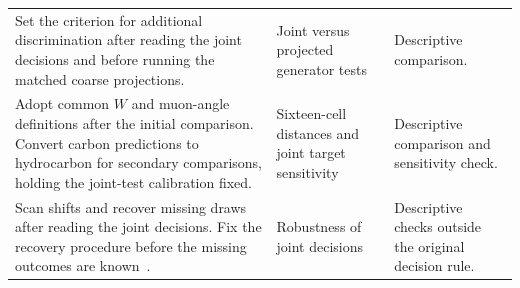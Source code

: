 \begin{xltabular}{\textwidth}{@{}>{\raggedright\arraybackslash{}\hsize}X
                               >{\raggedright\arraybackslash{}\hsize}X >{\raggedright\arraybackslash{}\hsize}X@{}}
  \addlinespace[2pt] Set the criterion for additional discrimination after reading the joint decisions and before running the matched coarse projections.
  & Joint versus projected generator tests & Descriptive comparison. \\
  \addlinespace[2pt] Adopt common $W$ and muon-angle definitions after the initial comparison. Convert carbon predictions to hydrocarbon for secondary comparisons, holding the joint-test calibration fixed.
  & Sixteen-cell distances and joint target sensitivity & Descriptive
  comparison and sensitivity check. \\
  \addlinespace[2pt] Scan shifts and recover missing draws after reading the joint decisions. Fix the recovery procedure before the missing outcomes are known~\cite{JointTestRecovery2026}.
  & Robustness of joint decisions & Descriptive checks outside the original
  decision rule. \\
\end{xltabular}
\endgroup

